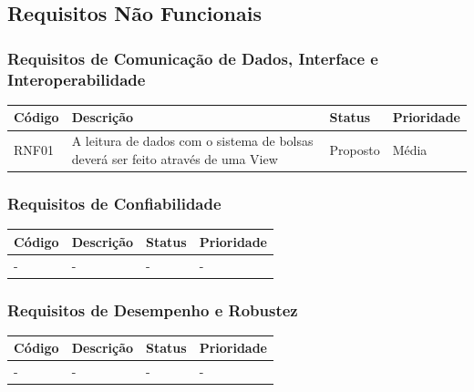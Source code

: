 \documentclass[a4paper, 12pt]{article}
\begin{document}
\subsection{Requisitos Não Funcionais}
\newpage
\subsubsection{Requisitos de Comunicação de Dados, Interface e Interoperabilidade}
	\begin{table}[ht]
		\centering

		\begin{tabular}{p{2cm}p{7cm}p{2cm}p{2cm}}
			\hline
			\cellcolor{gray}Código&\cellcolor{gray}Descrição&\cellcolor{gray}Status&\cellcolor{gray}Prioridade  \\
			\hline
            RNF01&A leitura de dados com o sistema de bolsas dever\'{a} ser feito atrav\'{e}s de uma View&Proposto&M\'{e}dia\\
			\hline
		\end{tabular}
	\end{table}%
\subsubsection{Requisitos de Confiabilidade}
\begin{table}[ht]
	\rowcolors{1}{}{}
	\centering

	\begin{tabular}{p{2cm}p{7cm}p{2cm}p{2cm}}
		\hline
		\cellcolor{gray}Código&\cellcolor{gray}Descrição&\cellcolor{gray}Status&\cellcolor{gray}Prioridade  \\
		\hline
		-&-&-&-\\
		\hline
	\end{tabular}
\end{table}%
\subsubsection{Requisitos de Desempenho e Robustez}
\begin{table}[ht]
	\centering

	\begin{tabular}{p{2cm}p{7cm}p{2cm}p{2cm}}
		\hline
		\cellcolor{gray}Código&\cellcolor{gray}Descrição&\cellcolor{gray}Status&\cellcolor{gray}Prioridade  \\
		\hline
		-&-&-&-\\
		\hline
	\end{tabular}
\end{table}%
\newpage
\end{document}
